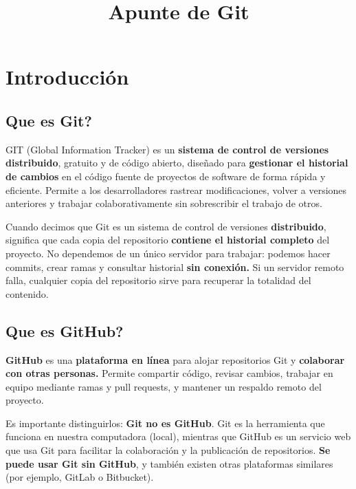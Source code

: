\documentclass{apuntes_itsv}
\begin{document}
\title{Apunte de Git}

\maketitle

\tableofcontents
\thispagestyle{empty}


\chapter{Introducción}
\setcounter{page}{1}
\section{Que es Git?}
GIT (Global Information Tracker) es un \textbf{sistema de control de versiones distribuido}, gratuito y de código
abierto, diseñado para \textbf{gestionar el historial de cambios} en el código fuente de proyectos de software de forma
rápida y eficiente. Permite a los desarrolladores rastrear modificaciones, volver a versiones anteriores y trabajar
colaborativamente sin sobrescribir el trabajo de otros.

Cuando decimos que Git es un sistema de control de versiones \textbf{distribuido}, significa que
cada copia del repositorio \textbf{contiene el historial completo} del proyecto.
No dependemos de un único servidor para trabajar: podemos hacer commits, crear ramas y consultar historial \textbf{sin conexión.}
Si un servidor remoto falla, cualquier copia del repositorio sirve para recuperar la totalidad del contenido.

\section{Que es GitHub?}
\textbf{GitHub} es una \textbf{plataforma en línea} para alojar repositorios Git y \textbf{colaborar con otras personas.}
Permite compartir código, revisar cambios, trabajar en equipo mediante ramas y pull requests, y mantener un respaldo remoto del proyecto.

Es importante distinguirlos: \textbf{Git no es GitHub}.
Git es la herramienta que funciona en nuestra computadora (local), mientras que GitHub es un servicio web que usa Git para
facilitar la colaboración y la publicación de repositorios.
\textbf{Se puede usar Git sin GitHub}, y también existen otras plataformas similares (por ejemplo, GitLab o Bitbucket).
\end{document}

